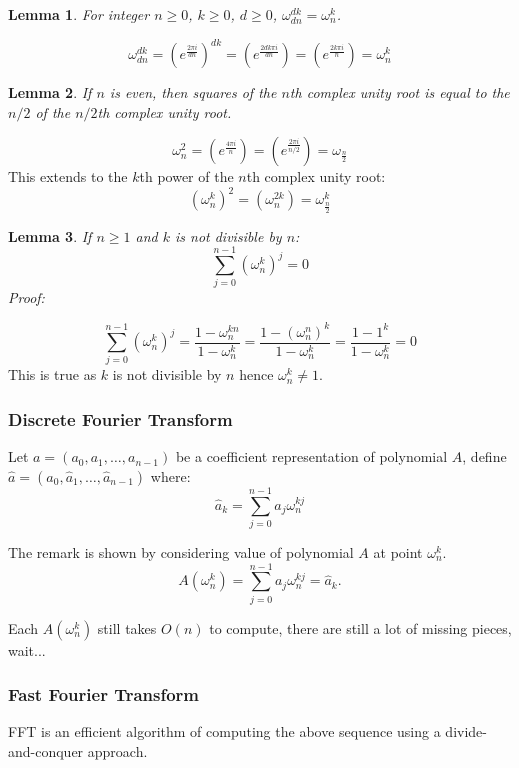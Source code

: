 \documentclass[10pt]{article}
\newtheorem{lemma}{Lemma}
\begin{document}
\begin{lemma}\label{cancel-lemma}
    For integer $n\geq 0$, $k \geq 0$, $d \geq 0$, $\omega^{dk}_{dn} = \omega^{k}_{n}$.
\end{lemma}
$$\omega^{dk}_{dn} = (e^{\frac{2\pi i}{dn}})^{dk} = (e^{\frac{2dk\pi i}{dn}}) = 
(e^{\frac{2k\pi i}{n}}) = \omega_n^{k}
$$

\begin{lemma}\label{halving-lemma}
    If $n$ is even, then squares of the $n$th complex unity root is equal to
    the $n/2$ of the $n/2$th complex unity root.
\end{lemma}
$$
\omega^2_{n} = (e^{\frac{4\pi i}{n}}) = (e^{\frac{2\pi i}{n/2}}) = \omega_{\frac{n}{2}}
$$
This extends to the $k$th power of the $n$th complex unity root:
$$
(\omega^k_{n})^2 = (\omega^{2k}_{n}) = \omega^{k}_{\frac{n}{2}}
$$
\begin{lemma}\label{summation-lemma}
    If $n \geq 1$ and $k$ is not divisible by $n$:
    $$
    \sum_{j=0}^{n-1}(\omega^{k}_n)^j = 0
    $$
Proof:
\end{lemma}
\[
    \sum_{j=0}^{n-1}(\omega^{k}_n)^j = \frac{1 - \omega^{kn}_n}{1 -\omega^{k}_n}
    = \frac{1 - (\omega^{n}_n)^k}{1 -\omega^{k}_n}
    = \frac{1 - 1^k}{1 -\omega^{k}_n}
    = 0
\]
This is true as $k$ is not divisible by $n$ hence $\omega^{k}_n \neq 1$.

\subsubsection{Discrete Fourier Transform}
Let $a = (a_0, a_1, \ldots, a_{n-1})$ be a coefficient representation of
polynomial $A$, define $\hat{a} = (\hat{a}_0, \hat{a}_1, \ldots,
\hat{a}_{n-1})$ where:
\[
    \hat{a}_k = \sum^{n-1}_{j=0}{a_j\omega^{kj}_n} 
\]

The remark is shown by considering value of polynomial $A$ at point
$\omega^k_n$.
\[
    A(\omega^k_n) = \sum^{n-1}_{j=0}{a_j\omega^{kj}_n} = \hat{a}_k.
\]

Each $A(\omega^k_n)$ still takes $O(n)$ to compute, there are still a lot of missing pieces, wait...

\subsubsection{Fast Fourier Transform}
FFT is an efficient algorithm of computing the above sequence using a
divide-and-conquer approach.
\end{document}
